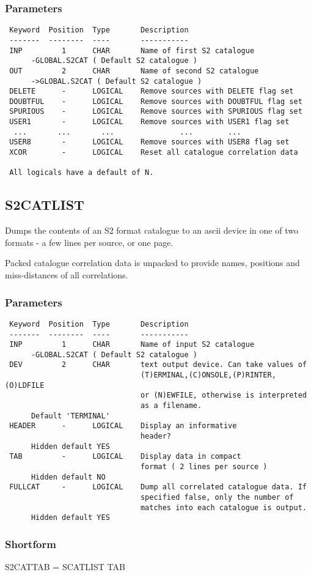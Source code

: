 \documentclass{book}
\renewcommand{\_}{{\tt\char'137}}     %
\begin{document}
\subsubsection{Parameters}
\begin{verbatim}
 Keyword  Position  Type       Description
 -------  --------  ----       -----------
 INP         1      CHAR       Name of first S2 catalogue
      -GLOBAL.S2CAT ( Default S2 catalogue )
 OUT         2      CHAR       Name of second S2 catalogue
      ->GLOBAL.S2CAT ( Default S2 catalogue )
 DELETE      -      LOGICAL    Remove sources with DELETE flag set
 DOUBTFUL    -      LOGICAL    Remove sources with DOUBTFUL flag set
 SPURIOUS    -      LOGICAL    Remove sources with SPURIOUS flag set
 USER1       -      LOGICAL    Remove sources with USER1 flag set
  ...       ...       ...               ...        ...
 USER8       -      LOGICAL    Remove sources with USER8 flag set
 XCOR        -      LOGICAL    Reset all catalogue correlation data

 All logicals have a default of N.

\end{verbatim}\subsection{S2CATLIST}
Dumps the contents of an S2 format catalogue to an ascii device in
one of two formats - a few lines per source, or one page.

Packed catalogue correlation data is unpacked to provide names,
positions and miss-distances of all correlations.
\subsubsection{Parameters}
\begin{verbatim}
 Keyword  Position  Type       Description
 -------  --------  ----       -----------
 INP         1      CHAR       Name of input S2 catalogue
      -GLOBAL.S2CAT ( Default S2 catalogue )
 DEV         2      CHAR       text output device. Can take values of
                               (T)ERMINAL,(C)ONSOLE,(P)RINTER,(O)LDFILE
                               or (N)EWFILE, otherwise is interpreted
                               as a filename.
      Default 'TERMINAL'
 HEADER      -      LOGICAL    Display an informative
                               header?
      Hidden default YES
 TAB         -      LOGICAL    Display data in compact
                               format ( 2 lines per source )
      Hidden default NO
 FULLCAT     -      LOGICAL    Dump all correlated catalogue data. If
                               specified false, only the number of
                               matches into each catalogue is output.
      Hidden default YES
\end{verbatim}\subsubsection{Shortform}
S2CATTAB = SCATLIST TAB
\end{document}
